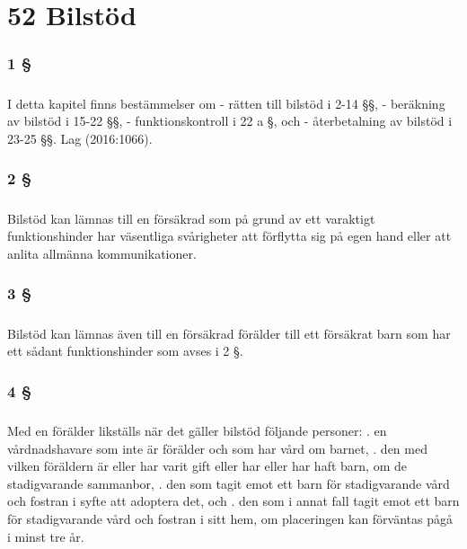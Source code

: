 \documentclass[a4paper,notitlepage,openany,10pt]{book}
\begin{document}
\chapter*{52 Bilstöd}
\subsection*{1 §}
\paragraph*{}
I detta kapitel finns bestämmelser om
\newline - rätten till bilstöd i 2-14 §§,
\newline - beräkning av bilstöd i 15-22 §§,
\newline - funktionskontroll i 22 a §, och
\newline - återbetalning av bilstöd i 23-25 §§.
Lag (2016:1066).
\subsection*{2 §}
\paragraph*{}
Bilstöd kan lämnas till en försäkrad som på grund av ett varaktigt funktionshinder har väsentliga svårigheter att förflytta sig på egen hand eller att anlita allmänna kommunikationer.
\subsection*{3 §}
\paragraph*{}
Bilstöd kan lämnas även till en försäkrad förälder till ett försäkrat barn som har ett sådant funktionshinder som avses i 2 §.
\subsection*{4 §}
\paragraph*{}
Med en förälder likställs när det gäller bilstöd följande personer:
. en vårdnadshavare som inte är förälder och som har vård om barnet,
. den med vilken föräldern är eller har varit gift eller har eller har haft barn, om de stadigvarande sammanbor,
. den som tagit emot ett barn för stadigvarande vård och fostran i syfte att adoptera det, och
. den som i annat fall tagit emot ett barn för stadigvarande vård och fostran i sitt hem, om placeringen kan förväntas pågå i minst tre år.
\end{document}
